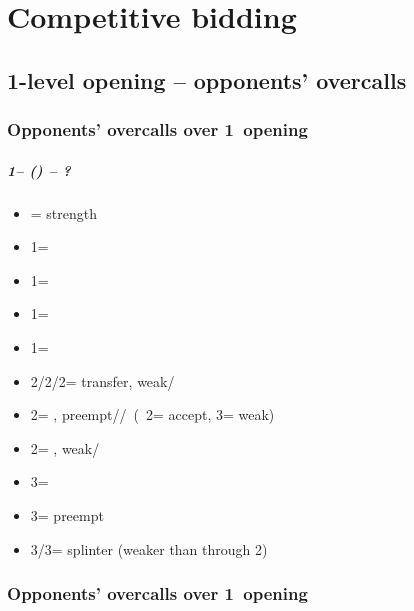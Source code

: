 \documentclass[12pt, a4paper]{report}
\begin{document}
\part*{\colorbox{RoyalPurple!30}{Competitive bidding}}
 {

    \chapter*{\colorbox{Plum!30}{1-level opening -- opponents' overcalls}}
     {

        \section*{\colorbox{blue!30}{Opponents' overcalls over 1\clubs\ opening}}
         {
            \subsubsection*{1\clubs -- (\dbl) -- ?}
            \begin{itemize}
                \item \rdbl = strength
                \item 1\diams = \trsf{\hearts}
                \item 1\hearts = \trsf{\spades}
                \item 1\spades = \trsf{\nt/\clubs}
                \item 1\nt = \nat
                \item 2\clubs/2\diams/2\hearts = transfer, weak/\gf
                \item 2\spades = \clubs, preempt/\inv/\gf\ (\then\ 2\nt = accept, 3\clubs = weak)
                \item 2\nt = \minor, weak/\gf
                \item 3\clubs = \mixed
                \item 3\diams = preempt
                \item 3\hearts/3\spades = splinter (weaker than through 2\spades)
            \end{itemize}
        }

        \section*{\colorbox{blue!30}{Opponents' overcalls over 1\diams\ opening}}
         {

}}}
\end{document}
